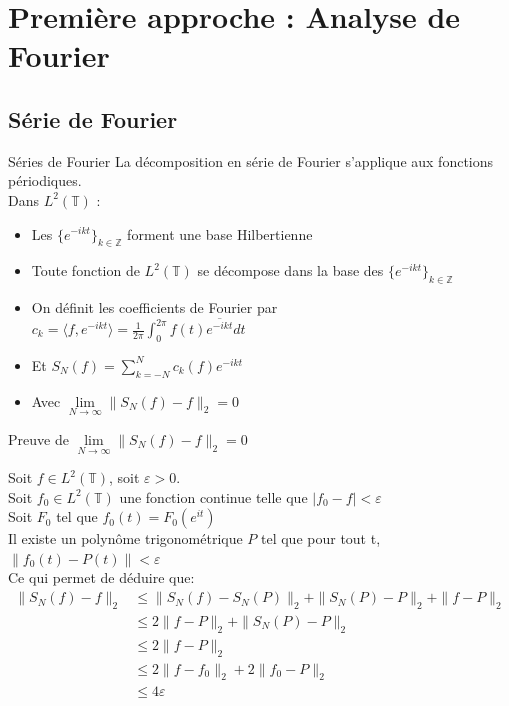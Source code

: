 \documentclass[french]{beamer}
\begin{document}
\section{Première approche : Analyse de Fourier}
\subsection{Série de Fourier}
\begin{frame}{Séries de Fourier}
	La décomposition en série de Fourier s'applique aux fonctions périodiques.\\ 
	
	Dans $L^2(\mathbb{T})$ : 
	\begin{itemize}
		\item<1-> Les $\{e^{-ikt}\}_{k \in \mathbb{Z} }$ forment une base Hilbertienne
		
		\item<2-> Toute fonction de $L^2(\mathbb{T})$ se décompose dans la base des $\{e^{-ikt}\}_{k \in \mathbb{Z}}$
		
		\item<3-> On définit les coefficients de Fourier par\\ $c_k =  \langle f,e^{-ikt} \rangle = \frac{1}{2\pi} \int_{0}^{2\pi} f(t) \overline{e^{-ikt}}dt $ 
		
		\item<4-> Et 
		$	S_N(f) = \sum_{k = -N}^N c_k(f) e^{-ikt} $
		
		\item<5-> Avec $ \lim\limits_{N \to \infty} \| S_N(f) - f \|_2  = 0 $ 
		
	\end{itemize}
	
\end{frame}

\begin{frame}{Preuve de $ \lim\limits_{N \to \infty} \| S_N(f) - f \|_2  = 0$ }
	
	Soit $f \in L^2(\mathbb{T})$, soit $\varepsilon > 0$.\\
	Soit $f_0 \in L^2(\mathbb{T})$ une fonction continue telle que 
	$ | f_0 - f | < \varepsilon $\\
	\pause
	Soit $F_0$ tel que $f_0(t) = F_0(e^{it})$\\ 
	Il existe un polynôme trigonométrique $P$ tel que pour tout t, $\|f_0(t) - P(t)\| < \varepsilon$\\
	Ce qui permet de déduire que: \\
	\pause
	\begin{align*}
	\| S_N(f) -f \|_2 &\leqslant \|S_N(f) - S_N(P)\|_2 + \| S_N(P) - P \|_2 + \| f- P \|_2 \\
	&	\leqslant 2 \| f - P\|_2 + \| S_N(P) - P\|_2 \ \\
	& \leqslant 2 \| f - P\|_2  \\
	& \leqslant 2 \| f - f_0\|_2 + 2 \| f_0- P\|_2 \\
	& \leqslant 4 \varepsilon
	\end{align*}
	
	
\end{frame}
\end{document}
